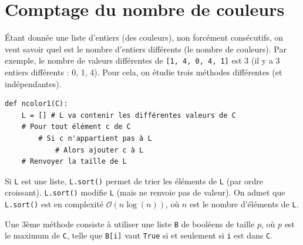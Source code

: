 \section*{Comptage du nombre de couleurs}    
Étant donnée une liste d’entiers (des couleurs), non forcément consécutifs, on veut savoir quel est le nombre d’entiers différents
(le nombre de couleurs). Par exemple, le nombre de valeurs différentes de \lstinline{[1, 4, 0, 4, 1]} est 3 (il y a 3 entiers différents :
0, 1, 4). Pour cela, on étudie trois méthodes différentes (et indépendantes).


\begin{lstlisting}
def ncolor1(C):
    L = [] # L va contenir les différentes valeurs de C
    # Pour tout élément c de C
        # Si c n'appartient pas à L
            # Alors ajouter c à L
    # Renvoyer la taille de L
\end{lstlisting}


Si \lstinline{L} est une liste, \lstinline{L.sort()} permet de trier les éléments de \lstinline{L} (par ordre croissant). \lstinline{L.sort()} modifie \lstinline{L} (mais ne renvoie
pas de valeur). On admet que \lstinline{L.sort()} est en complexité $\mathcal{O}(n \log(n))$, où $n$ est le nombre d’éléments de \lstinline{L}.


Une 3ème méthode consiste à utiliser une liste \lstinline{B} de booléens de taille $p$, où $p$ est le maximum de \lstinline{C}, telle que \lstinline{B[i]} vaut
\lstinline{True} si et seulement si \lstinline{i} est dans \lstinline{C}.


